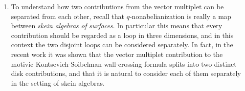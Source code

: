 \documentclass{article}
\numberwithin{equation}{section}
\begin{document}
\begin{enumerate}
\begin{enumerate}
\item
To understand how two contributions from the vector multiplet can be separated from each other, recall that $q$-nonabelianization is really a map between \textit{skein algebras of surfaces}. In particular this means that every contribution should be regarded as a loop in three dimensions, and in this context the two disjoint loops can be considered separately. 
In fact, in the recent work \cite[Section 11]{Ekholm:2025anq} it was shown that the vector multiplet contribution to the motivic Kontsevich-Soibelman wall-crossing formula splits into two distinct disk contributions, and that it is natural to consider each of them separately in the setting of skein algebras.


\end{enumerate}
\end{enumerate}
\end{document}
